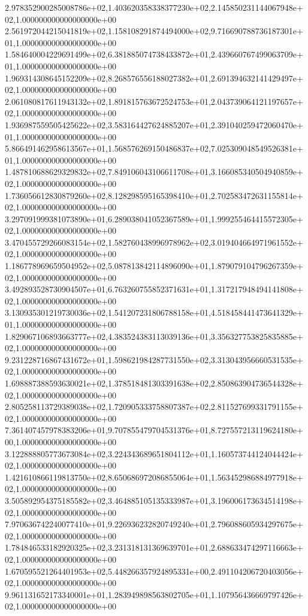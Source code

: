 2.978352900285008786e+02,1.403620358338377230e+02,2.145850231144067948e+02,1.000000000000000000e+00
2.561972044215041819e+02,1.158108291874494000e+02,9.716690788736187301e+01,1.000000000000000000e+00
1.584640004229691499e+02,6.381885074738433872e+01,2.439660767499063709e+01,1.000000000000000000e+00
1.969314308645152209e+02,8.268576556188027382e+01,2.691394632141429497e+02,1.000000000000000000e+00
2.061080817611943132e+02,1.891815763672524753e+01,2.043739064121197657e+02,1.000000000000000000e+00
1.936987559505425622e+02,3.583164427624885207e+01,2.391040259472060470e+01,1.000000000000000000e+00
5.866491462958613567e+01,1.568576269150486837e+02,7.025309048549526381e+01,1.000000000000000000e+00
1.487810688629329832e+02,7.849106043106611708e+01,3.166085340504940859e+02,1.000000000000000000e+00
1.736056612830879260e+02,8.128298595165398410e+01,2.702583472631155814e+02,1.000000000000000000e+00
3.297091999381073890e+01,6.289038041052367589e+01,1.999255464415572305e+02,1.000000000000000000e+00
3.470455729266083154e+02,1.582760438996978962e+02,3.019404664971961552e+02,1.000000000000000000e+00
1.186778969659504952e+02,5.087813842114896090e+01,1.879079104796267359e+02,1.000000000000000000e+00
3.492893528730904507e+01,6.763260755852371631e+01,1.317217948494141808e+02,1.000000000000000000e+00
3.130935301219730036e+02,1.541207231806788158e+01,4.518458441473641329e+01,1.000000000000000000e+00
1.829067106893663777e+02,4.383524383113039136e+01,3.356327753825835885e+02,1.000000000000000000e+00
9.231228716867431672e+01,1.598621984287731550e+02,3.313043956660531535e+02,1.000000000000000000e+00
1.698887388593630021e+02,1.378518481303391638e+02,2.850863904736544328e+02,1.000000000000000000e+00
2.805258113729389038e+02,1.720905333758807387e+02,2.811527699331791155e+02,1.000000000000000000e+00
7.361407457978383206e+01,9.707855479704531376e+01,8.727557213119624180e+00,1.000000000000000000e+00
3.122888805773673084e+02,3.224343689651804112e+01,1.160573744124044424e+02,1.000000000000000000e+00
1.421610866119813750e+02,8.650686972086855064e+01,1.563452986884977918e+02,1.000000000000000000e+00
3.505892954375185582e+02,3.464885105135333987e+01,3.196006173634514198e+02,1.000000000000000000e+00
7.970636742240077410e+01,9.226936232820749240e+01,2.796088605934297675e+02,1.000000000000000000e+00
1.784846533182920325e+02,3.231318131369639701e+01,2.688633474297116663e+02,1.000000000000000000e+00
1.670595521264401953e+02,5.448266357924895331e+00,2.491104206720403056e+02,1.000000000000000000e+00
9.961131652173340001e+01,1.283949898563802705e+01,1.107956436669797426e+02,1.000000000000000000e+00
